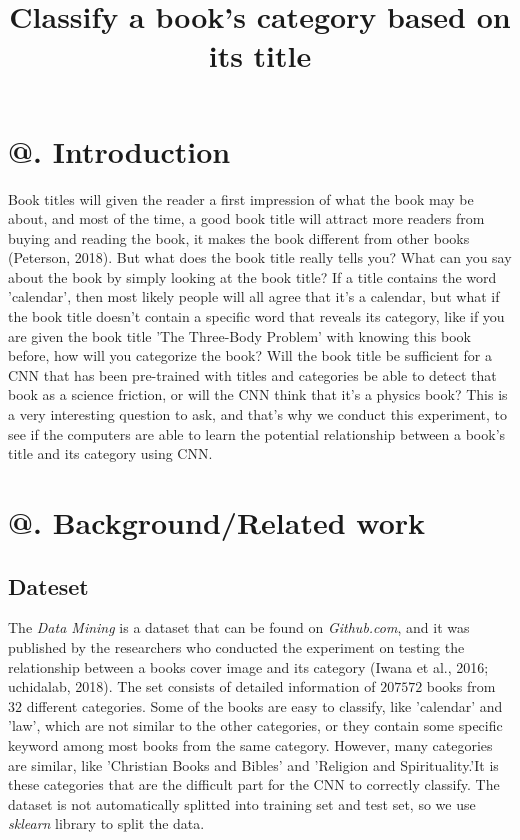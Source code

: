 \documentclass[jou,apacite, 10px]{apa6}
\title{Classify a book's category based on its title}
\makeatletter
\newcommand*{\rom}[1]{\expandafter\@slowromancap\romannumeral #1@}
\makeatother
\begin{document}
\maketitle    
                        
\section{\rom{1}. Introduction}
Book titles will given the reader a first impression of what the book may be about, and most of the time, a good book title will attract more readers from buying and reading the book, it makes the book different from other books (Peterson, 2018). But what does the book title really tells you? What can you say about the book by simply looking at the book title? If a title contains the word 'calendar', then most likely people will all agree that it's a calendar, but what if the book title doesn't contain a specific word that reveals its category, like if you are given the book title 'The Three-Body Problem' with knowing this book before, how will you categorize the book? Will the book title be sufficient for a CNN that has been pre-trained with titles and categories be able to detect that book as a science friction, or will the CNN think that it's a physics book? This is a very interesting question to ask, and that's why we conduct this experiment, to see if the computers are able to learn the potential relationship between a book's title and its category using CNN.

\section{\rom{2}. Background/Related work}

\subsection{Dateset}
The \textit{Data Mining} is a dataset that can be found on \textit{Github.com}, and it was published by the researchers who conducted the experiment on testing the relationship between a books cover image and its category (Iwana et al., 2016; uchidalab, 2018). The set consists of detailed information of $207572$ books from $32$ different categories. Some of the books are easy to classify, like 'calendar' and 'law', which are not similar to the other categories, or they contain some specific keyword among most books from the same category. However, many categories are similar, like 'Christian Books and Bibles' and 'Religion and Spirituality.'It is these categories that are the difficult part for the CNN to correctly classify. The dataset is not automatically splitted into training set and test set, so we use \textit{sklearn} library to split the data.
\end{document}
